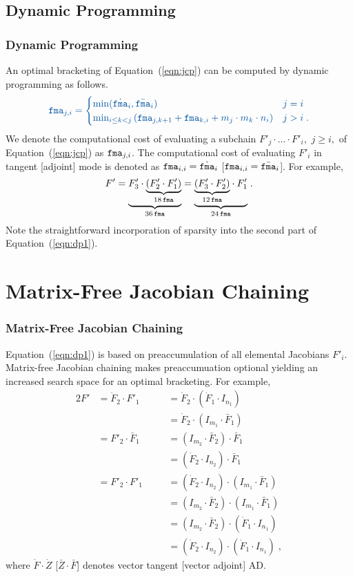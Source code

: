 \documentclass[ucs,10pt]{beamer}
\newcommand{\fma}{{\small {\tt fma}}}
\begin{document}
\subsection{Dynamic Programming}

\begin{frame}
\frametitle{Dynamic Programming}
\vfill
\vfill
An optimal bracketing of Equation~(\ref{eqn:jcp}) can be computed by dynamic programming as follows.
\begin{equation} \label{eqn:dp1}
	\textcolor{rwth-blue}{
\fma_{j,i}=
\begin{cases}
\min(\dot{\fma}_i,\bar{\fma}_i) & j=i \\
\min_{i \leq k < j} \left (\fma_{j,k+1}+\fma_{k,i} + m_j \cdot m_k \cdot n_i \right ) & j>i \; .
\end{cases}
	}
\end{equation}
\vfill
We denote the computational cost of evaluating a subchain
$F'_j \cdot \ldots \cdot F'_i,$ $j\geq i,$ of Equation~(\ref{eqn:jcp})
as $\fma_{j,i}$. 
	The computational cost of evaluating $F'_i$ in 
	tangent [adjoint]
	mode is denoted as $\fma_{i,i}=\dot{\fma}_i$ [$\fma_{i,i}=\bar{\fma}_i$].
	For example, $$F'=\underset{36\, \fma}{\underbrace{F'_3 \cdot \underset{18\, \fma}{\underbrace{(F'_2 \cdot F'_1)}}}}=\underset{24\, \fma}{\underbrace{\underset{12\, \fma}{\underbrace{(F'_3 \cdot F'_2)}} \cdot F'_1}} \; .$$
\vfill
Note the straightforward incorporation of sparsity into the second part of Equation~(\ref{eqn:dp1}). 
\vfill
\vfill
\end{frame}

\section{Matrix-Free Jacobian Chaining}

\begin{frame}
\frametitle{Matrix-Free Jacobian Chaining}
\vfill
\vfill
Equation~(\ref{eqn:dp1}) is based on preaccumulation of all elemental Jacobians $F'_i.$
\vfill
Matrix-free Jacobian chaining makes preaccumuation optional yielding an increased search space for an optimal bracketing. For example, 
\begin{alignat*}{2}
        F'&=\dot{F}_2 \cdot F'_1 &\quad &=\dot{F}_2 \cdot (\dot{F}_1  \cdot I_{n_1}) \\
	&&&=\dot{F}_2 \cdot (I_{m_1} \cdot \bar{F}_1) \\
        &=F'_2 \cdot \bar{F}_1&&=(I_{m_2} \cdot \bar{F}_2) \cdot \bar{F}_1 \\
	&&&=(\dot{F}_2 \cdot I_{n_2}) \cdot \bar{F}_1 \\
        &=F'_2 \cdot F'_1&&=(\dot{F}_2 \cdot I_{n_2}) \cdot (I_{m_1} \cdot \bar{F}_1) \\
        &&&=(I_{m_2} \cdot \bar{F}_2) \cdot (I_{m_1} \cdot \bar{F}_1) \\
        &&&=(I_{m_2} \cdot \bar{F}_2) \cdot (\dot{F}_1 \cdot I_{n_1}) \\
        &&&=(\dot{F}_2 \cdot I_{n_2}) \cdot (\dot{F}_1 \cdot I_{n_1}) \; ,
\end{alignat*}
	where $\dot{F} \cdot \dot{Z}$ [$\bar{Z} \cdot \bar{F}$] denotes vector tangent [vector adjoint] AD.
\vfill
\vfill
\end{frame}
\end{document}
